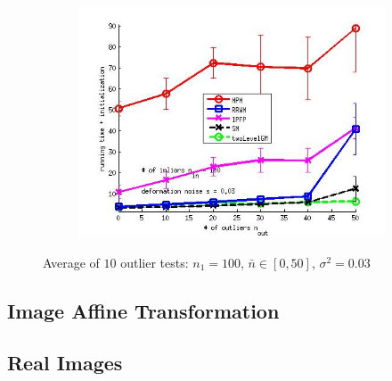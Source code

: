 \documentclass[
	fontsize=12pt,
	paper=a4,
	twoside=false,
	numbers=noenddot,
	plainheadsepline,
	toc=listof,
	toc=bibliography
]{scrartcl}
\begin{document}
\begin{figure}[h]
\begin{subfigure}[b]{0.3\textwidth}
		\includegraphics[scale=0.25]{"fig_ver2608/syntheticPointSets/ver4.3.2/outliertest_n50/time_summary_avg10t"} 
	\end{subfigure} 	
	\caption{Average of $10$ outlier tests: $n_1=100$, $\bar{n}\in[0,50]$, $\sigma^2=0.03$}
	\label{fig:test3_ver432}
\end{figure}

\FloatBarrier

\subsection{Image Affine Transformation}


\subsection{Real Images}


	
\end{document}
